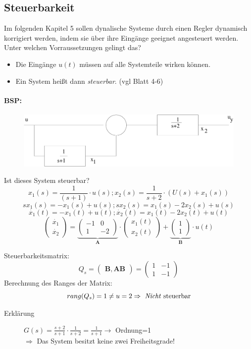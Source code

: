 \message{ !name(Mitschrieb_SysRegel.tex)}\documentclass[12pt,a4paper,ngerman]{scrartcl}
\begin{document}
\subsection{Steuerbarkeit}

Im folgenden Kapitel 5 sollen dynalische Systeme durch einen Regler dynamisch korrigiert werden, indem sie über ihre Eingänge geeignet angesteuert werden.\\
Unter welchen Vorraussetzungen gelingt das?
\begin{itemize}
\item Die Eingänge $u(t)$ müssen auf alle Systemteile wirken können.
\item Ein System heißt dann \emph{steuerbar}. (vgl Blatt 4-6)
\end{itemize}

\paragraph{BSP:}

\begin{figure}[H]
  \centering
  \includegraphics[width=.7\linewidth]{sysregel_bsp_kap4}
\end{figure}
Ist dieses System steuerbar?
\[
x_1(s)=\frac{1}{(s+1)}\cdot u(s);x_2(s)=\frac{1}{s+2}\cdot (U(s)+x_1(s))
\]
\[
sx_1(s)=-x_1(s)+u(s);sx_2(s)=x_1(s)-2x_2(s)+u(s)
\]
\[
\dot{x_1}(t)=-x_1(t)+u(t);\dot{x_2}(t)=x_1(t)-2x_2(t)+u(t)
\]
\[
\begin{pmatrix}
\dot{x_1}\\
\dot{x_2}
\end{pmatrix}
=
\underbrace{\begin{pmatrix}
 -1&0\\
 1&-2 
\end{pmatrix}}_{\mathbf{A}}
\cdot
\begin{pmatrix}
  x_1(t)\\
  x_2(t)
\end{pmatrix}
+
\underbrace{\begin{pmatrix}
  1\\
1
\end{pmatrix}}_{\mathbf{B}}
\cdot u(t)
\]

Steuerbarkeitsmatrix:
\[
Q_s=
\begin{pmatrix}
  \mathbf{B},\mathbf{A}\mathbf{B}
\end{pmatrix}
=
\begin{pmatrix}
  1&-1\\
1&-1
\end{pmatrix}
\]
Berechnung des Ranges der Matrix:
\[
rang(Q_s)=1 \neq u=2\Rightarrow \text{ \emph{Nicht} steuerbar}
\]
\begin{description}
\item[Erklärung] $G(s)=\frac{s+2}{s+1}\cdot\frac{1}{s+2}=\frac{1}{s+1}\rightarrow $ Ordnung=1\\
$\Rightarrow$ Das System besitzt keine zwei Freiheitsgrade!
\end{description}
\end{document}
